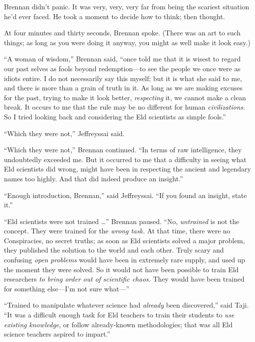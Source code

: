 {
 Brennan didn't panic. It was very, very, very far
from being the scariest situation he'd ever faced. He
took a moment to decide how to think; then thought.}

{
 At four minutes and thirty seconds, Brennan spoke. (There was an
art to such things; as long as you were doing it anyway, you might as
well make it look easy.)}

{
 ``A woman of wisdom,'' Brennan
said, ``once told me that it is wisest to regard our
past selves as fools beyond redemption---to see the people we once were
as idiots entire. I do not necessarily say this myself; but it is what
she said to me, and there is more than a grain of truth in it. As long
as we are making excuses for the past, trying to make it look better,
\textit{respecting} it, we cannot make a clean break. It occurs to me
that the rule may be no different for human \textit{civilizations}. So
I tried looking back and considering the Eld scientists as simple
fools.''}

{
 ``Which they were not,''
Jeffreyssai said.}

{
 ``Which they were not,''
Brennan continued. ``In terms of raw intelligence,
they undoubtedly exceeded me. But it occurred to me that a difficulty
in seeing what Eld scientists did wrong, might have been in respecting
the ancient and legendary names too highly. And that did indeed produce
an insight.''}

{
 ``Enough introduction,
Brennan,'' said Jeffreyssai. ``If
you found an insight, state it.''}

{
 ``Eld scientists were not trained
\ldots'' Brennan paused. ``No,
\textit{untrained} is not the concept. They were trained for the
\textit{wrong task.} At that time, there were no Conspiracies, no
secret truths; as soon as Eld scientists solved a major problem, they
published the solution to the world and each other. Truly scary and
confusing \textit{open problems} would have been in extremely rare
supply, and used up the moment they were solved. So it would not have
been possible to train Eld researchers \textit{to bring order out of
scientific chaos.} They would have been trained for something
else---I'm not sure what---''}

{
 ``Trained to manipulate whatever science had
\textit{already} been discovered,'' said Taji.
``It was a difficult enough task for Eld teachers to
train their students to \textit{use existing knowledge}, or follow
already-known methodologies; that was all Eld science teachers aspired
to impart.''}

